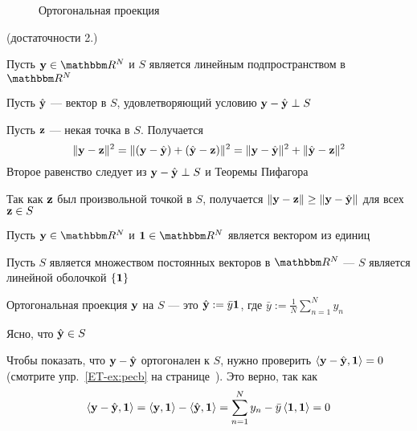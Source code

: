 \begin{frame}

    \vspace{2em}
    \begin{figure}
       \begin{center}
        
        \caption{\label{f:orth_proj2D0} Ортогональная проекция}
       \end{center}
    \end{figure}

\end{frame}

\begin{frame}

     \vspace{2em}
    \Prf (достаточности 2.)
    
    Пусть $\boldy \in \RR^N$
    и $S$ является линейным подпространством в $\RR^N$
    
    Пусть $\hat {{\mathbf y}}$ --- вектор в 
    $S$, удовлетворяющий условию ${\mathbf y} - \hat {{\mathbf y}} \perp S$
    
    Пусть ${\mathbf z}$ --- некая точка в $S$. Получается
    \begin{equation*}
    \| {\mathbf y} - {\mathbf z} \|^2
    = \| ({\mathbf y} - \hat {{\mathbf y}}) + (\hat {{\mathbf y}} - {\mathbf z}) \|^2
    = \| {\mathbf y} - \hat {{\mathbf y}} \|^2  + \| \hat {{\mathbf y}} - {\mathbf z}  \|^2
    \end{equation*}
    Второе равенство следует из ${\mathbf y} - \hat {{\mathbf y}} \perp S$ и 
    Теоремы Пифагора
    
    \vspace{.7em}
    Так как ${\mathbf z}$ был произвольной точкой в $S$,
    получается $\| {\mathbf y} - {\mathbf z} \| \geq \| {\mathbf y} - \hat {{\mathbf y}} \|$
    для всех ${\mathbf z} \in S$
    
\end{frame}

\begin{frame}

    \vspace{2em}
    \Eg
    Пусть $\boldy \in \RR^N$ и $\boldone \in \RR^N$ является вектором из единиц
    
    Пусть $S$ является множеством постоянных векторов в $\RR^N$ --- $S$ 
    является линейной оболочкой $\{{\mathbf 1}\}$
    
    Ортогональная проекция ${\mathbf y}$ на $S$ --- это $\hat {\mathbf y} := \bar y
    {\mathbf 1}$, где $\bar y := \frac{1}{N} \sum_{n=1}^N y_n$
    
    Ясно, что $\hat {\mathbf y} \in S$ 
    
    \vspace{.7em}
    Чтобы показать, что ${\mathbf y} -
    \hat {\mathbf y}$ ортогонален к $S$, нужно проверить
    $\left\langle{ {\mathbf y} -  \hat {\mathbf y} ,  {\mathbf 1} }\right\rangle = 0$ (смотрите упр.~\ref{ET-ex:pecb} на
    странице~\pageref{ET-ex:pecb}). Это верно, так как
    \begin{equation*}
        \left\langle{ {\mathbf y} -  \hat {\mathbf y} ,  {\mathbf 1} }\right\rangle
        = \left\langle{ {\mathbf y} ,  {\mathbf 1} }\right\rangle - \left\langle{ \hat {\mathbf y} ,  {\mathbf 1} }\right\rangle
        = \sum_{n=1}^N y_n - \bar y \left\langle{ {\mathbf 1} ,  {\mathbf 1} }\right\rangle
        = 0
    \end{equation*}
    
\end{frame}

